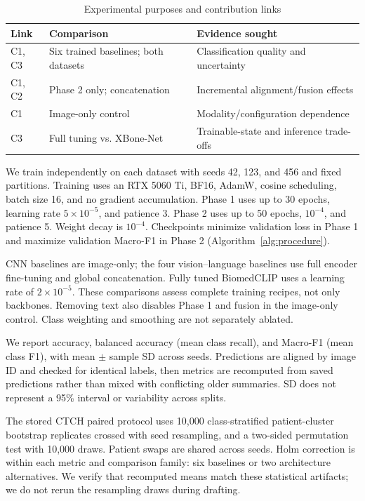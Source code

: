 \documentclass[conference,a4paper]{IEEEtran}
\begin{document}
\begin{table}[t]
\caption{Experimental purposes and contribution links}
\label{tab:purposes}
\footnotesize
\begin{tabularx}{\columnwidth}{@{}p{9mm}YY@{}}
\toprule
Link & Comparison & Evidence sought \\
\midrule
C1, C3 & Six trained baselines; both datasets & Classification quality and uncertainty \\
C1, C2 & Phase 2 only; concatenation & Incremental alignment/fusion effects \\
C1 & Image-only control & Modality/configuration dependence \\
C3 & Full tuning vs. XBone-Net & Trainable-state and inference trade-offs \\
\bottomrule
\end{tabularx}
\end{table}

We train independently on each dataset with seeds 42, 123, and 456 and fixed partitions. Training uses an RTX 5060 Ti, BF16, AdamW, cosine scheduling, batch size 16, and no gradient accumulation. Phase 1 uses up to 30 epochs, learning rate $5\times10^{-5}$, and patience 3. Phase 2 uses up to 50 epochs, $10^{-4}$, and patience 5. Weight decay is $10^{-4}$. Checkpoints minimize validation loss in Phase 1 and maximize validation Macro-F1 in Phase 2 (Algorithm~\ref{alg:procedure}).

CNN baselines are image-only; the four vision--language baselines use full encoder fine-tuning and global concatenation. Fully tuned BiomedCLIP uses a learning rate of $2\times10^{-5}$. These comparisons assess complete training recipes, not only backbones. Removing text also disables Phase 1 and fusion in the image-only control. Class weighting and smoothing are not separately ablated.

We report accuracy, balanced accuracy (mean class recall), and Macro-F1 (mean class F1), with mean $\pm$ sample SD across seeds. Predictions are aligned by image ID and checked for identical labels, then metrics are recomputed from saved predictions rather than mixed with conflicting older summaries. SD does not represent a 95\% interval or variability across splits.

The stored CTCH paired protocol uses 10,000 class-stratified patient-cluster bootstrap replicates crossed with seed resampling, and a two-sided permutation test with 10,000 draws. Patient swaps are shared across seeds. Holm correction is within each metric and comparison family: six baselines or two architecture alternatives. We verify that recomputed means match these statistical artifacts; we do not rerun the resampling draws during drafting.
\end{document}
